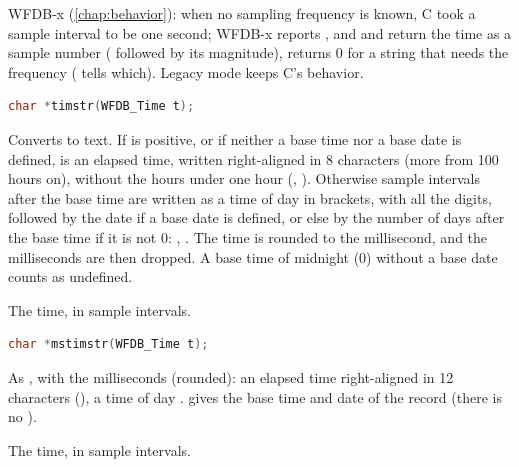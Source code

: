 WFDB-x (\cref{chap:behavior}): when no sampling frequency is known, C took a
sample interval to be one second; WFDB-x reports , and  and  return the
time as a sample number ( followed by its magnitude), 
returns 0 for a string that needs the frequency (
tells which). Legacy mode keeps C's behavior.

\begin{lstlisting}[language=C,style=signature]
char *timstr(WFDB_Time t);
\end{lstlisting}
Converts  to text. If  is positive, or if neither a base time
nor a base date is defined,  is an elapsed time, written
 right-aligned in 8 characters (more from 100 hours on),
without the hours under one hour (, ). Otherwise  sample intervals
after the base time are written as a time of day in brackets, with all the
digits, followed by the date if a base date is defined, or else by the
number of days after the base time if it is not 0: , . The time is rounded to the
millisecond, and the milliseconds are then dropped. A
base time of midnight (0) without a base date counts as undefined.
\begin{params}
\item[t] The time, in sample intervals.
\end{params}

\begin{lstlisting}[language=C,style=signature]
char *mstimstr(WFDB_Time t);
\end{lstlisting}
As , with the milliseconds (rounded): an elapsed time
 right-aligned in 12 characters (), a
time of day .  gives the
base time and date of the record (there is no ).
\begin{params}
\item[t] The time, in sample intervals.
\end{params}

